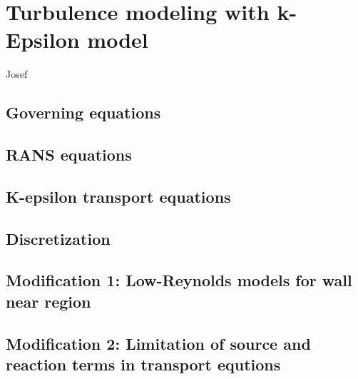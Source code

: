 
\chapter{Turbulence modeling with k-Epsilon model} %
\label{cha:turbulence_modeling_with_k_epsilon_model}

Josef

\section{Governing equations} %
\label{sec:governing_equations}



\section{RANS equations} %
\label{sec:rans_equations}


\section{K-epsilon transport equations} %
\label{sec:k_epsilon_transport_equations}



\section{Discretization} %
\label{sec:discretization}


\section{Modification 1: Low-Reynolds models for wall near region} %
\label{sec:modification_1_low_reynolds_models_for_wall_near_region}


\section{Modification 2: Limitation of source and reaction terms in transport equtions} %
\label{sec:modification_2_limitation_of_source_and_reaction_terms_in_transport_equtions}

